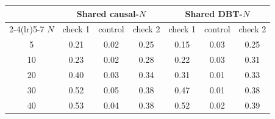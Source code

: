 \begin{tabular}{@{}ccccccc@{}}
\toprule
 & \multicolumn{3}{c}{Shared causal-$N$} & \multicolumn{3}{c}{Shared DBT-$N$} \\
\cmidrule(lr){2-4}\cmidrule(lr){5-7}
$N$ & check 1 & control & check 2 & check 1 & control & check 2 \\
\midrule
5 & 0.21 & 0.02 & 0.25 & 0.15 & 0.03 & 0.25 \\
10 & 0.23 & 0.02 & 0.28 & 0.22 & 0.03 & 0.31 \\
20 & 0.40 & 0.03 & 0.34 & 0.31 & 0.01 & 0.33 \\
30 & 0.52 & 0.05 & 0.38 & 0.47 & 0.01 & 0.38 \\
40 & 0.53 & 0.04 & 0.38 & 0.52 & 0.02 & 0.39 \\
\bottomrule
\end{tabular}
